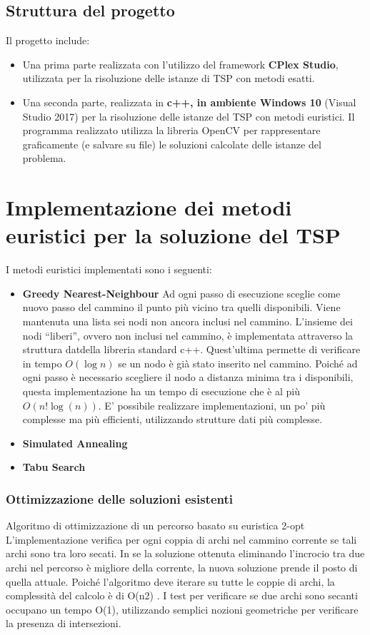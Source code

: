 	\subsection{Struttura del progetto}
	
	Il progetto include: 
	\begin{itemize}


	\item	Una prima parte realizzata con l’utilizzo del framework \textbf{CPlex Studio}, utilizzata per la risoluzione delle istanze di TSP con metodi esatti. 
	\item	Una seconda parte, realizzata in \textbf{c++, in ambiente Windows 10 }(Visual Studio 2017) per la risoluzione delle istanze del TSP con metodi euristici. Il programma realizzato utilizza la libreria OpenCV per rappresentare graficamente (e salvare su file) le soluzioni calcolate delle istanze del problema. 
		\end{itemize}
	
	\section{Implementazione dei metodi euristici per la soluzione del TSP}
	I metodi euristici implementati sono i seguenti: 
	\begin{itemize}
	\item	\textbf{Greedy Nearest-Neighbour}
	Ad ogni passo di esecuzione sceglie come nuovo passo del cammino il punto più vicino tra quelli disponibili. Viene mantenuta una lista sei nodi non ancora inclusi nel cammino.
	L’insieme dei nodi “liberi”, ovvero non inclusi nel cammino, è implementata attraverso la struttura datdella libreria standard c++. Quest’ultima permette di verificare in tempo $O(\log n)$ se un nodo è già stato inserito nel cammino. 
	Poiché ad ogni passo è necessario scegliere il nodo a distanza minima tra i disponibili, questa implementazione ha un tempo di esecuzione che è al più $O(n! \log(n))$. E’ possibile realizzare implementazioni, un po’ più complesse ma più efficienti, utilizzando strutture dati più complesse. 

	\item \textbf{Simulated Annealing}
\item \textbf{Tabu Search}

\end{itemize}
	
\subsubsection{	Ottimizzazione delle soluzioni esistenti}
	Algoritmo di ottimizzazione di un percorso basato su euristica 2-opt
	L’implementazione verifica per ogni coppia di archi nel cammino corrente se tali archi sono tra loro secati. In se la soluzione ottenuta eliminando l’incrocio tra due archi nel percorso è migliore della corrente, la nuova soluzione prende il posto di quella attuale. Poiché l’algoritmo deve iterare su tutte le coppie di archi, la complessità del calcolo è di O(n2) .  I test per verificare se due archi sono secanti occupano un tempo O(1), utilizzando semplici nozioni geometriche per verificare la presenza di intersezioni. 
